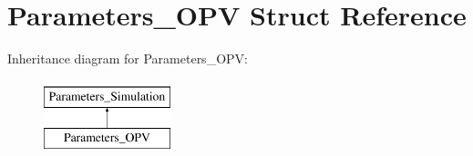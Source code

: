 \hypertarget{struct_parameters___o_p_v}{}\section{Parameters\+\_\+\+O\+PV Struct Reference}
\label{struct_parameters___o_p_v}
Inheritance diagram for Parameters\+\_\+\+O\+PV\+:\begin{figure}[H]
\begin{center}
\leavevmode
\includegraphics[height=2.000000cm]{struct_parameters___o_p_v}
\end{center}
\end{figure}
